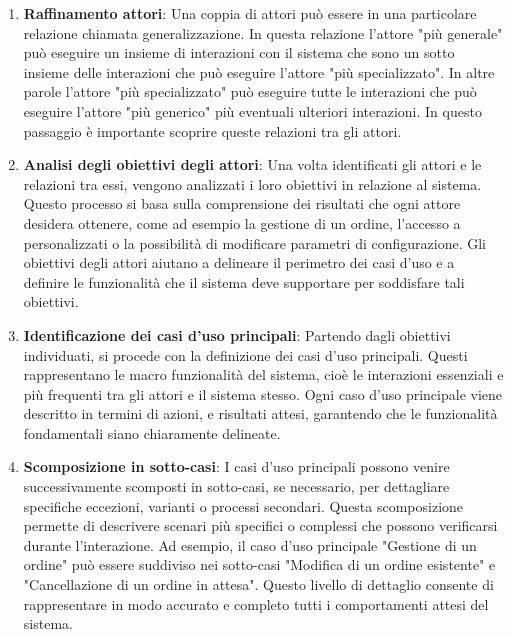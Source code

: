 \begin{enumerate}
    \item \textbf{Raffinamento attori}: Una coppia di attori può essere in una particolare relazione chiamata generalizzazione.
    In questa relazione l'attore "più generale" può eseguire un insieme di interazioni con il sistema che sono un sotto insieme delle interazioni che può eseguire l'attore "più specializzato".
    In altre parole l'attore "più specializzato" può eseguire tutte le interazioni che può eseguire l'attore "più generico" più eventuali ulteriori interazioni.
    In questo passaggio è importante scoprire queste relazioni tra gli attori.

    \item \textbf{Analisi degli obiettivi degli attori}: Una volta identificati gli attori e le relazioni tra essi, vengono analizzati i loro obiettivi in relazione al sistema. 
    Questo processo si basa sulla comprensione dei risultati che ogni attore desidera ottenere, come ad esempio la gestione di un ordine, l'accesso a  personalizzati o la possibilità di modificare parametri di configurazione.
    Gli obiettivi degli attori aiutano a delineare il perimetro dei casi d'uso e a definire le funzionalità che il sistema deve supportare per soddisfare tali obiettivi.

    \item \textbf{Identificazione dei casi d'uso principali}: Partendo dagli obiettivi individuati, si procede con la definizione dei casi d'uso principali. Questi rappresentano le macro funzionalità del sistema, cioè le interazioni essenziali e più frequenti tra gli attori e il sistema stesso. Ogni caso d'uso principale viene descritto in termini di azioni, e risultati attesi, garantendo che le funzionalità fondamentali siano chiaramente delineate.
    
    \item \textbf{Scomposizione in sotto-casi}: I casi d'uso principali possono venire successivamente scomposti in sotto-casi, se necessario, per dettagliare specifiche eccezioni, varianti o processi secondari. Questa scomposizione permette di descrivere scenari più specifici o complessi che possono verificarsi durante l'interazione. Ad esempio, il caso d'uso principale "Gestione di un ordine" può essere suddiviso nei sotto-casi "Modifica di un ordine esistente" e "Cancellazione di un ordine in attesa". Questo livello di dettaglio consente di rappresentare in modo accurato e completo tutti i comportamenti attesi del sistema.

\end{enumerate}